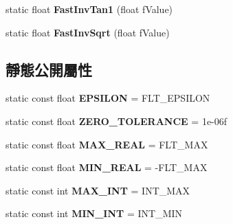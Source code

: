 \begin{DoxyCompactItemize}
\item 
static float {\bfseries Fast\+Inv\+Tan1} (float f\+Value)\hypertarget{class_magnum_1_1_math_a781b6b8ae8ae84a0c5c086eff1b38e1c}{}\label{class_magnum_1_1_math_a781b6b8ae8ae84a0c5c086eff1b38e1c}

\item 
static float {\bfseries Fast\+Inv\+Sqrt} (float f\+Value)\hypertarget{class_magnum_1_1_math_a171d1c3d79d809c49c61967e3b605c95}{}\label{class_magnum_1_1_math_a171d1c3d79d809c49c61967e3b605c95}

\end{DoxyCompactItemize}
\subsection*{靜態公開屬性}
\begin{DoxyCompactItemize}
\item 
static const float {\bfseries E\+P\+S\+I\+L\+ON} = F\+L\+T\+\_\+\+E\+P\+S\+I\+L\+ON\hypertarget{class_magnum_1_1_math_a5ee876d5cb049f0b3b71f3c54ed8efa0}{}\label{class_magnum_1_1_math_a5ee876d5cb049f0b3b71f3c54ed8efa0}

\item 
static const float {\bfseries Z\+E\+R\+O\+\_\+\+T\+O\+L\+E\+R\+A\+N\+CE} = 1e-\/06f\hypertarget{class_magnum_1_1_math_a2a086f9c9635d2cd14d274f66f06dfa9}{}\label{class_magnum_1_1_math_a2a086f9c9635d2cd14d274f66f06dfa9}

\item 
static const float {\bfseries M\+A\+X\+\_\+\+R\+E\+AL} = F\+L\+T\+\_\+\+M\+AX\hypertarget{class_magnum_1_1_math_afaec099767da90aa93ec3d498c0f9945}{}\label{class_magnum_1_1_math_afaec099767da90aa93ec3d498c0f9945}

\item 
static const float {\bfseries M\+I\+N\+\_\+\+R\+E\+AL} = -\/F\+L\+T\+\_\+\+M\+AX\hypertarget{class_magnum_1_1_math_a02068c349fd5f0b10f50284d35ceb63e}{}\label{class_magnum_1_1_math_a02068c349fd5f0b10f50284d35ceb63e}

\item 
static const int {\bfseries M\+A\+X\+\_\+\+I\+NT} = I\+N\+T\+\_\+\+M\+AX\hypertarget{class_magnum_1_1_math_a90b8d6d74721e38496498717f810dc79}{}\label{class_magnum_1_1_math_a90b8d6d74721e38496498717f810dc79}

\item 
static const int {\bfseries M\+I\+N\+\_\+\+I\+NT} = I\+N\+T\+\_\+\+M\+IN\hypertarget{class_magnum_1_1_math_a7f1f65b7401768e041994557cdfca249}{}\label{class_magnum_1_1_math_a7f1f65b7401768e041994557cdfca249}


\end{DoxyCompactItemize}
